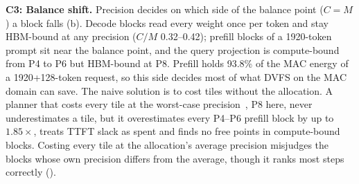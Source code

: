 \textbf{C3: Balance shift.}
Precision decides on which side of the balance point ($C=M$) a block falls (b).
Decode blocks read every weight once per token and stay HBM-bound at any precision ($C/M$ 0.32--0.42); prefill blocks of a 1920-token prompt sit near the balance point, and the query projection is compute-bound from P4 to P6 but HBM-bound at P8.
Prefill holds 93.8\% of the MAC energy of a 1920+128-token request, so this side decides most of what DVFS on the MAC domain can save.
The naive solution is to cost tiles without the allocation.
A planner that costs every tile at the worst-case precision~\cite{xue2026finedvfs}, P8 here, never underestimates a tile, but it overestimates every P4--P6 prefill block by up to $1.85\times$, treats TTFT slack as spent and finds no free points in compute-bound blocks.
Costing every tile at the allocation's average precision misjudges the blocks whose own precision differs from the average, though it ranks most steps correctly ().

